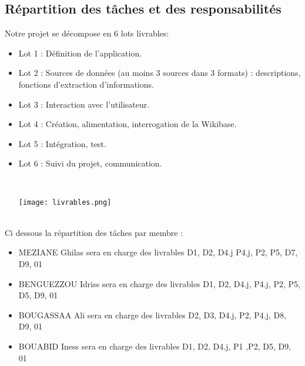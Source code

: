 \documentclass[a4paper, 12pt]{article}
\begin{document}
\subsection{Répartition des tâches et des responsabilités}
Notre projet se décompose en 6 lots livrables: \\
\begin{itemize}
    \item Lot 1 : Définition de l’application.
    \item Lot 2 : Sources de données (au moins 3 sources dans 3 formats) : descriptions, fonctions d’extraction d’informations.
    \item Lot 3 : Interaction avec l’utilisateur.
    \item Lot 4 : Création, alimentation, interrogation de la Wikibase.
    \item Lot 5 : Intégration, test.
    \item Lot 6 : Suivi du projet, communication.


\begin{minipage}{0.25\textwidth}\

\texttt{[image: livrables.png]}

\end{minipage}

\end{itemize}
\\
Ci dessous la répartition des tâches par membre : \\
\begin{itemize}
    \item MEZIANE Ghilas sera en charge des livrables D1, D2, D4.j P4.j, P2, P5, D7, D9, 01
    \item BENGUEZZOU Idriss sera en charge des livrables D1, D2, D4.j, P4.j, P2, P5, D5, D9, 01
    \item BOUGASSAA Ali sera en charge des livrables D2, D3, D4.j, P2, P4.j, D8, D9, 01
    \item BOUABID Iness sera en charge des livrables D1, D2, D4.j, P1 ,P2, D5, D9, 01
\end{itemize}


    
\end{document}
